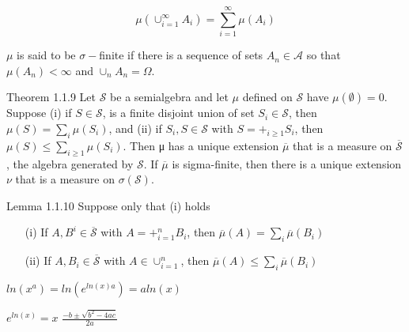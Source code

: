 \documentclass{article}
\begin{document}
\begin{displaymath}
  \mu(\cup_{i=1}^\infty A_i)=\sum^\infty_{i=1}\mu(A_i)
\end{displaymath}

$\mu$ is said to be $\sigma-$finite if there is a sequence of sets $A_n\in\mathcal{A}$ so that $\mu(A_n)<\infty$ and $\cup_n A_n=\Omega$.

\begin{theo}{Theorem 1.1.9}
Let $\mathcal{S}$ be a semialgebra and let $\mu$ defined on $\mathcal{S}$ have $\mu(\emptyset)=0$. Suppose (i) if $S\in\mathcal{S}$, is a finite disjoint union of set $S_i\in \mathcal{S}$, then $\mu(S)= \sum_i \mu(S_i)$, and (ii) if $S_i,S\in\mathcal{S}$ with $S=+_{i\ge 1}S_i$, then $\mu(S)\le\sum_{i\ge 1}\mu(S_i)$. Then μ has a unique extension $\overline\mu $ that is a measure on $\overline{\mathcal{S}}$, the algebra generated by $\mathcal{S}$. If $\overline\mu $ is sigma-finite, then there is a unique extension $\nu$ that is a measure on $\sigma(\mathcal{S})$.	
\end{theo}

\begin{theo}{Lemma 1.1.10}
Suppose only that (i) holds

\begin{enumerate}
  \item [(i)] If $A,B^i\in \overline{\mathcal{S}}$ with $A=+^n_{i=1}B_i$, then $\overline{\mu}(A)=\sum_i\overline{\mu}(B_i)$
  \item [(ii)] If $A,B_i\in\overline{\mathcal{S}}$ with $A\in\cup^n_{i=1}$, then $\overline{\mu}(A)\le\sum_{i}\overline{\mu}(B_i)$

\end{enumerate}

\end{theo}




$ln(x^a)=ln(e^{ln(x)a})=aln(x)$

$e^{ln(x)}=x$
$\frac{-b\pm\sqrt{b^2-4ac}}{2a}$
\end{document}
